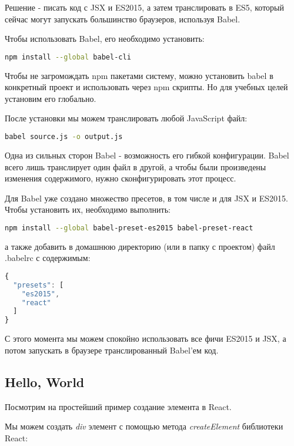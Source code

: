 Решение - писать код с JSX и ES2015, а затем транслировать в ES5, который сейчас могут запускать большинство браузеров, используя Babel.

Чтобы использовать Babel, его необходимо установить:

\begin{lstlisting}[language=bash]
	npm install --global babel-cli
\end{lstlisting}

Чтобы не загромождать npm пакетами систему, можно установить babel в конкретный проект и использовать через npm скрипты. Но для учебных целей установим его глобально.

После установки мы можем транслировать любой JavaScript файл:

\begin{lstlisting}[language=bash]
	babel source.js -o output.js
\end{lstlisting}

Одна из сильных сторон Babel - возможность его гибкой конфигурации. Babel всего лишь транслирует один файл в другой, а чтобы были произведены изменения содержимого, нужно сконфигурировать этот процесс.

Для Babel уже создано множество пресетов, в том числе и для JSX и ES2015. Чтобы установить их, необходимо выполнить:

\begin{lstlisting}[language=bash]
npm install --global babel-preset-es2015 babel-preset-react	
\end{lstlisting}

а также добавить в домашнюю директорию (или в папку с проектом) файл .babelrc с содержимым:

\begin{lstlisting}[language=JavaScript]
{
  "presets": [
    "es2015",
    "react" 
  ]
}

\end{lstlisting}

С этого момента мы можем спокойно использовать все фичи ES2015 и JSX, а потом запускать в браузере транслированный Babel'ем код.

\subsection{Hello, World}

Посмотрим на простейший пример создание элемента в React. 

Мы можем создать \textit{div} элемент с помощью метода \textit{createElement} библиотеки React:

